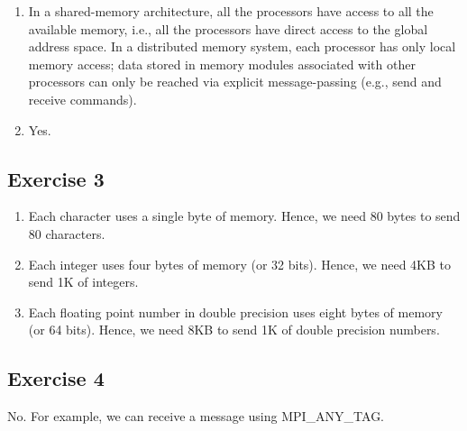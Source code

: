 \documentclass[11pt]{article}
\begin{document}
\begin{enumerate}
\item In a shared-memory architecture, all the processors
have access to all the available memory, i.e., all the 
processors have direct access to the global address space.
In a distributed memory system, each processor has only 
local memory access; data stored in memory modules associated 
with other processors can only be reached via explicit 
message-passing (e.g., send and receive commands).

\item Yes. 
\end{enumerate}

\subsection*{Exercise 3}

\begin{enumerate}
\item Each character uses a single byte of memory. 
Hence, we need 80 bytes to send 80 characters.
\item Each integer uses four bytes of memory (or 32 bits). 
Hence, we need 4KB to send 1K of integers. 
\item Each floating point number in double precision uses eight bytes of memory 
(or 64 bits). Hence, we need 8KB to send 1K of double precision numbers. 
\end{enumerate}

\subsection*{Exercise 4}
No. For example, we can receive a message using MPI\_ANY\_TAG. 
\end{document}

